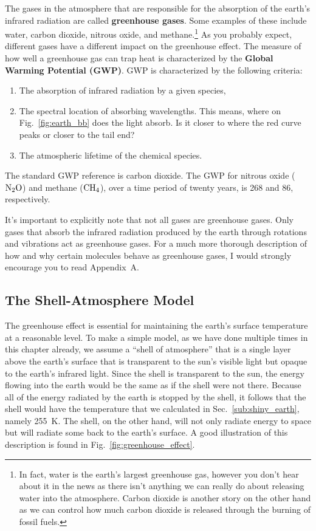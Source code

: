     The gases in the atmosphere that are responsible for the absorption of the earth's infrared radiation are called \textbf{greenhouse gases}. Some examples of these include water, carbon dioxide, nitrous oxide, and methane.\footnote{In fact, water is the earth's largest greenhouse gas, however you don't hear about it in the news as there isn't anything we can really do about releasing water into the atmosphere. Carbon dioxide is another story on the other hand as we can control how much carbon dioxide is released through the burning of fossil fuels.} As you probably expect, different gases have a different impact on the greenhouse effect. The measure of how well a greenhouse gas can trap heat is characterized by the \textbf{Global Warming Potential (GWP)}. GWP is characterized by the following criteria:
    \begin{enumerate}
        \item The absorption of infrared radiation by a given species,
        \item The spectral location of absorbing wavelengths. This means, where on Fig.~\ref{fig:earth_bb} does the light absorb. Is it closer to where the red curve peaks or closer to the tail end? 
        \item The atmospheric lifetime of the chemical species.
    \end{enumerate}
    The standard GWP reference is carbon dioxide. The GWP for nitrous oxide ({$\rm N_2O$}) and methane ({$\rm CH_4$}), over a time period of twenty years, is 268 and 86, respectively. 
    
    It's important to explicitly note that not all gases are greenhouse gases. Only gases that absorb the infrared radiation produced by the earth through rotations and vibrations act as greenhouse gases. For a much more thorough description of how and why certain molecules behave as greenhouse gases, I would strongly encourage you to read Appendix~A. 
    

    \subsection{The Shell-Atmosphere Model} %
    \label{sub:shell_atm}

    The greenhouse effect is essential for maintaining the earth's surface temperature at a reasonable level. To make a simple model, as we have done multiple times in this chapter already, we assume a ``shell of atmosphere'' that is a single layer above the earth's surface that is transparent to the sun's visible light but opaque to the earth's infrared light. Since the shell is transparent to the sun, the energy flowing into the earth would be the same as if the shell were not there. Because all of the energy radiated by the earth is stopped by the shell, it follows that the shell would have the temperature that we calculated in Sec.~\ref{sub:shiny_earth}, namely \SI{255}{\kelvin}. The shell, on the other hand, will not only radiate energy to space but will radiate some back to the earth's surface. A good illustration of this description is found in Fig.~\ref{fig:greenhouse_effect}. 

